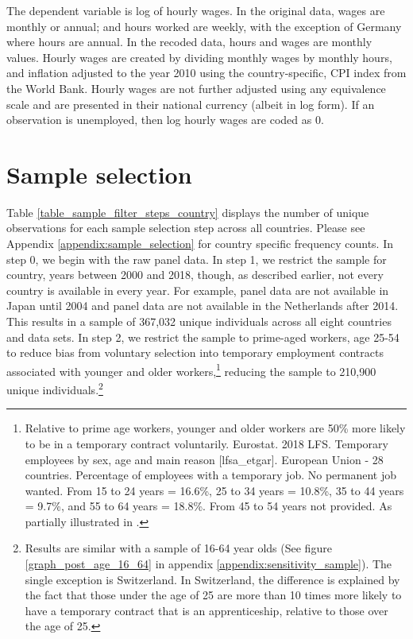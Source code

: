 \documentclass[12pt]{article}
\begin{document}
The dependent variable is log of hourly wages.  In the original data, wages are monthly or annual; and hours worked are weekly, with the exception of Germany where hours are annual.  In the recoded data, hours and wages are monthly values.  Hourly wages are created by dividing monthly wages by monthly hours, and inflation adjusted to the year 2010 using the country-specific, CPI index from the World Bank.  Hourly wages are not further adjusted using any equivalence scale and are presented in their national currency (albeit in log form).  If an observation is unemployed, then log hourly wages are coded as 0.

\section{Sample selection}

Table \ref{table_sample_filter_steps_country} displays the number of unique observations for each sample selection step across all countries.  Please see Appendix \ref{appendix:sample_selection} for country specific frequency counts.  In step 0, we begin with the raw panel data.  In step 1, we restrict the sample for country, years between 2000 and 2018, though, as described earlier, not every country is available in every year.  For example, panel data are not available in Japan until 2004 and panel data are not available in the Netherlands after 2014.  This results in a sample of 367,032 unique individuals across all eight countries and data sets.  In step 2, we restrict the sample to prime-aged workers, age 25-54 to reduce bias from voluntary selection into temporary employment contracts associated with younger and older workers,\footnote{Relative to prime age workers, younger and older workers are 50\% more likely to be in a temporary contract voluntarily.  Eurostat.  2018 LFS.  Temporary employees by sex, age and main reason [lfsa\_etgar].  European Union - 28 countries.  Percentage of employees with a temporary job.  No permanent job wanted.  From 15 to 24 years = 16.6\%, 25 to 34 years = 10.8\%, 35 to 44 years = 9.7\%, and 55 to 64 years = 18.8\%.  From 45 to 54 years not provided.  As partially illustrated in \citealp[fig. 22]{eurofound_2020}.} reducing the sample to 210,900 unique individuals.\footnote{Results are similar with a sample of 16-64 year olds  (See figure \ref{graph_post_age_16_64} in appendix \ref{appendix:sensitivity_sample}).  The single exception is Switzerland. In Switzerland, the difference is explained by the fact that those under the age of 25 are more than 10 times more likely to have a temporary contract that is an apprenticeship, relative to those over the age of 25.}   
\end{document}

